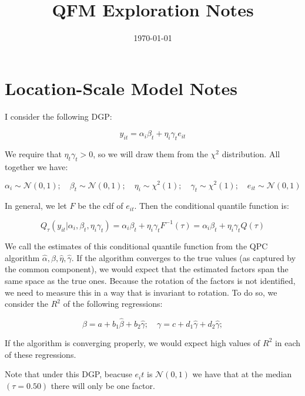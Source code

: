 \documentclass[12pt]{article}
\title{QFM Exploration Notes}
\author{}
\date{\today}
\begin{document}
\maketitle

\section{Location-Scale Model Notes}

I consider the following DGP:

\begin{equation*}
	y_{it} = \alpha_i\beta_t + \eta_i\gamma_te_{it}
\end{equation*}

\noindent We require that $\eta_t\gamma_t > 0$, so we will draw them from the $\chi^2$ distribution. All together we have:

\[
	\alpha_i \sim \mathcal{N}(0, 1); \quad \beta_t \sim \mathcal{N}(0, 1); \quad \eta_i \sim \chi^2(1); \quad \gamma_t \sim \chi^2(1); \quad e_{it} \sim \mathcal{N}(0,1)
\]

In general, we let $F$ be the cdf of $e_{it}$. Then the conditional quantile function is:

%
\begin{equation*}
	Q_{\tau }(y_{it}|\alpha_i, \beta_t, \eta_i\gamma_t)=\alpha_i\beta_t + \eta_i\gamma_t F^{-1}(\tau)= \alpha_i\beta_t + \eta_i\gamma_t Q(\tau)
\end{equation*}
%

We call the estimates of this conditional quantile function from the QPC algorithm $\hat{\alpha}, \hat{\beta}, \hat{\eta}, \hat{\gamma}$. If the algorithm converges to the true values (as captured by the common component), we would expect that the estimated factors span the same space as the true ones. Because the rotation of the factors is not identified, we need to measure this in a way that is invariant to rotation. To do so, we consider the $R^2$ of the following regressions:

\begin{equation*}
	\beta = a + b_1\hat{\beta} + b_2\hat{\gamma}; \quad \gamma = c + d_1\hat{\gamma} + d_2\hat{\gamma};
\end{equation*}

If the algorithm is converging properly, we would expect high values of $R^2$ in each of these regressions.

Note that under this DGP, beacuse $e_it$ is $\mathcal{N}(0, 1)$ we have that at the median $(\tau = 0.50)$ there will only be one factor.  
\end{document}
